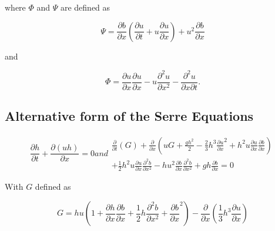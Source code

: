 where $\Phi$ and $\Psi$ are defined as
\begin{defn}
	\label{eqn:FullSerreNonConVarDef}
	\begin{equation*}
	{ \Psi }  = \dfrac{\partial b}{\partial x}\left(\dfrac{\partial u}{\partial t} + u\dfrac{\partial u}{\partial x} \right)  + u^2\dfrac{\partial b}{\partial x}
	\end{equation*}
	
	and
	
	\begin{equation*}
	 { \Phi }  = \dfrac{\partial u }{\partial x} \dfrac{\partial u}{\partial x} -u \dfrac{\partial^2 u}{\partial x^2}  - \dfrac{\partial^2 u}{\partial x \partial t} .
	\end{equation*}

\end{defn}	


\subsection{Alternative form of the Serre Equations}


\begin{subequations}
	\label{eqn:FullSerreCon}
	\begin{equation}
	\label{eqn:FullSerreConMass}
	\frac{\partial h}{\partial t} + \dfrac{\partial (uh)}{\partial x} = 0
	\end{equation}
	
	and
	
	\begin{multline}
	\label{eqn:Serreconsconmom}
	\frac{\partial}{\partial t} \left( G \right)  + \frac{\partial}{\partial x} \left( {u} G + \frac{gh^2}{2} - \frac{2}{3}h^3 \frac{\partial {u}}{\partial x}^2 + h^2 {u}\frac{\partial {u}}{\partial x}\frac{\partial b}{\partial x} \right) \\ + \frac{1}{2}h^2 {u} \frac{\partial {u}}{\partial x} \frac{\partial^2 b}{\partial x^2}  - h {u}^2\frac{\partial b}{\partial x}\frac{\partial^2 b}{\partial x^2} + gh\frac{\partial b}{\partial x} = 0
	\end{multline}
	
\end{subequations}

%
With $G$ defined as
\begin{defn}
	\label{defn:SerreEqnConservedQuantity1}
	\[ G =  h {u} \left(1 + \frac{\partial h}{\partial x}\frac{\partial b}{\partial x} + \frac{1}{2}h\frac{\partial^2 b}{\partial x^2} + \frac{\partial b}{\partial x}^2 \right) - \frac{\partial}{\partial x}\left(\frac{1}{3}h^3  \frac{\partial {u}}{\partial x}\right)\]
\end{defn}

